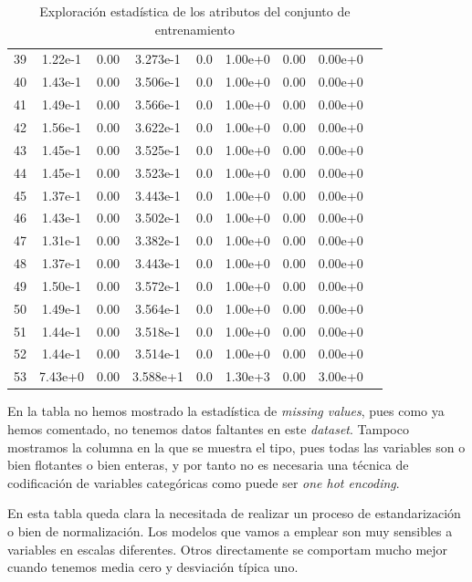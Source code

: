 \documentclass[11pt]{article}
\begin{document}
\begin{table}[H]
{\begin{tabular}{|c|c|c|c|c|c|c|c|c|}
    39   & 1.22e-1&       0.00&  3.273e-1&     0.0&  1.00e+0&      0.00&  0.00e+0 \\
    40   & 1.43e-1&       0.00&  3.506e-1&     0.0&  1.00e+0&      0.00&  0.00e+0 \\
    41   & 1.49e-1&       0.00&  3.566e-1&     0.0&  1.00e+0&      0.00&  0.00e+0 \\
    42   & 1.56e-1&       0.00&  3.622e-1&     0.0&  1.00e+0&      0.00&  0.00e+0 \\
    43   & 1.45e-1&       0.00&  3.525e-1&     0.0&  1.00e+0&      0.00&  0.00e+0 \\
    44   & 1.45e-1&       0.00&  3.523e-1&     0.0&  1.00e+0&      0.00&  0.00e+0 \\
    45   & 1.37e-1&       0.00&  3.443e-1&     0.0&  1.00e+0&      0.00&  0.00e+0 \\
    46   & 1.43e-1&       0.00&  3.502e-1&     0.0&  1.00e+0&      0.00&  0.00e+0 \\
    47   & 1.31e-1&       0.00&  3.382e-1&     0.0&  1.00e+0&      0.00&  0.00e+0 \\
    48   & 1.37e-1&       0.00&  3.443e-1&     0.0&  1.00e+0&      0.00&  0.00e+0 \\
    49   & 1.50e-1&       0.00&  3.572e-1&     0.0&  1.00e+0&      0.00&  0.00e+0 \\
    50   & 1.49e-1&       0.00&  3.564e-1&     0.0&  1.00e+0&      0.00&  0.00e+0 \\
    51   & 1.44e-1&       0.00&  3.518e-1&     0.0&  1.00e+0&      0.00&  0.00e+0 \\
    52   & 1.44e-1&       0.00&  3.514e-1&     0.0&  1.00e+0&      0.00&  0.00e+0 \\
    53   & 7.43e+0&       0.00&  3.588e+1&     0.0&  1.30e+3&      0.00&  3.00e+0 \\
    \hline
  \end{tabular}
}
\caption{Exploración estadística de los atributos del conjunto de entrenamiento}
\end{table}

En la tabla no hemos mostrado la estadística de \emph{missing values}, pues como ya hemos comentado, no tenemos datos faltantes en este \emph{dataset}. Tampoco mostramos la columna en la que se muestra el tipo, pues todas las variables son o bien flotantes o bien enteras, y por tanto no es necesaria una técnica de codificación de variables categóricas como puede ser \emph{one hot encoding}.

En esta tabla queda clara la necesitada de realizar un proceso de estandarización o bien de normalización. Los modelos que vamos a emplear son muy sensibles a variables en escalas diferentes. Otros directamente se comportam mucho mejor cuando tenemos media cero y desviación típica uno.
\end{document}
